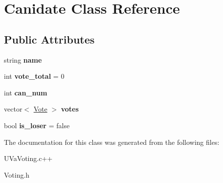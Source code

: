 \hypertarget{classCanidate}{\section{Canidate Class Reference}
\label{classCanidate}
}
\subsection*{Public Attributes}
\begin{DoxyCompactItemize}
\item 
\hypertarget{classCanidate_a8b68fc651c980811d1d1b6c3482fb5c0}{string {\bfseries name}}\label{classCanidate_a8b68fc651c980811d1d1b6c3482fb5c0}

\item 
\hypertarget{classCanidate_a9d43a59296ece348806c984b0eec7644}{int {\bfseries vote\-\_\-total} = 0}\label{classCanidate_a9d43a59296ece348806c984b0eec7644}

\item 
\hypertarget{classCanidate_af217bc86b6ba1d341fbfab225bdb3ee6}{int {\bfseries can\-\_\-num}}\label{classCanidate_af217bc86b6ba1d341fbfab225bdb3ee6}

\item 
\hypertarget{classCanidate_afe7456821b121c15e425e77d137a296f}{vector$<$ \hyperlink{classVote}{Vote} $>$ {\bfseries votes}}\label{classCanidate_afe7456821b121c15e425e77d137a296f}

\item 
\hypertarget{classCanidate_a57cf0dc7472245c75140a574f9b0919b}{bool {\bfseries is\-\_\-loser} = false}\label{classCanidate_a57cf0dc7472245c75140a574f9b0919b}

\end{DoxyCompactItemize}


The documentation for this class was generated from the following files\-:\begin{DoxyCompactItemize}
\item 
U\-Va\-Voting.\-c++\item 
Voting.\-h\end{DoxyCompactItemize}
